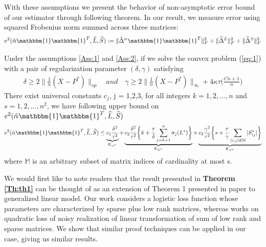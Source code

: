 \documentclass[AMS,STIX1COL]{WileyNJD-v2}
\begin{document}
With these assumptions we present the behavior of non-asymptotic error bound of our estimator through following theorem. In our result, we measure error using squared Frobenius norm summed across three matrices:
\[
    e^{2}(\hat{\alpha}\mathbbm{1}\mathbbm{1}^T,\widehat{L},\widehat{S}):=\|\hat{\Delta}^{\alpha}\mathbbm{1}\mathbbm{1}^T\|_{F}^{2} + \|\widehat{\Delta}^{L}\|_{F}^{2} + \|\widehat{\Delta}^{S}\|_{F}^{2}
\]

\begin{theorem} \label{Th:th1}
Under the assumptions \ref{Ass:1} and \ref{Ass:2},
if we solve the convex problem (\ref{eq:1}) with a pair of regularization parameter $(\delta,\gamma)$ satisfying 
\begin{align} \label{eq:49}
\delta \geq 2\|\frac{1}{n}(X-P^{*})\|_{op} \quad and \quad \gamma \geq 2\|\frac{1}{n}(X-P^{*})\|_{\infty}+4\kappa\tau\bigg(\frac{Cn+1}{n} \bigg)
\end{align}
There exist universal constants $c_{j}$, j = 1,2,3,  for all integers $k = 1,2,...,n$ and $s = 1,2,...,n^{2}$, we have following upper bound on $e^{2}(\hat{\alpha}\mathbbm{1}\mathbbm{1}^T,\widehat{L},\widehat{S})$
\begin{align}
    e^{2}(\hat{\alpha}\mathbbm{1}\mathbbm{1}^T,\widehat{L},\widehat{S}) \leq
    \underbrace{c_{1}\frac{\delta^{2}}{\tau^{2}}}
    _{\mathcal{K}_{\alpha^*}} +
    \underbrace{c_{2}\frac{\delta^{2}}{\tau^{2}}
    \bigg\{k + \frac{\tau}{\delta}\sum_{j=k+1}^{n}\sigma_{j}(L^{*})\bigg\}}_{\mathcal{K}_{L^*}} +
    \underbrace{c_{3}\frac{\gamma^{2}}{\tau^{2}}
    \bigg\{s + \frac{\tau}{\gamma}\sum_{(i,j) \notin \mathbb{M}}|S^*_{ij}|\bigg\}}_{\mathcal{K}_{S^*}}
\end{align}
where $\mathbb{M}$ is an arbitrary subset of matrix indices of cardinality at most s.
\end{theorem}

We would first like to note readers that the result presented in \textbf{Theorem \ref{Th:th1}} can be thought of as an extension of Theorem 1 presented in paper \cite{agarwal2012noisy} to generalized linear model. 
Our work considers a logistic loss function whose parameters are characterized by sparse plus low rank matrices, whereas \cite{agarwal2012noisy} works on quadratic loss of noisy realization of linear transformation of sum of low rank and sparse matrices. 
We show that similar proof techniques can be applied in our case, giving us similar results.
\end{document}
